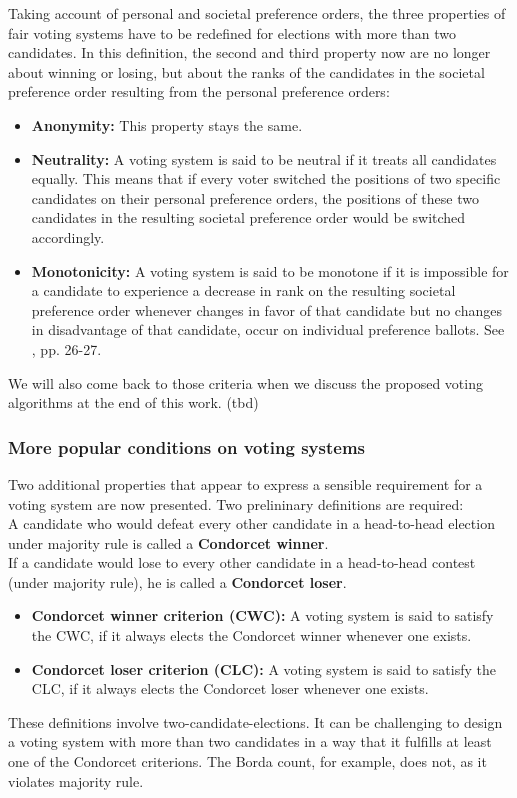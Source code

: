 Taking account of personal and societal preference orders, the three properties of fair voting systems have to be redefined for elections with more than two candidates. In this definition, the second and third property now are no longer about winning or losing, but about the ranks of the candidates in the societal preference order resulting from the personal preference orders:
\begin{itemize}
\item \textbf{Anonymity:} This property stays the same.  
\item \textbf{Neutrality:} A voting system is said to be neutral if it treats all candidates equally. This means that if every voter switched the positions of two specific candidates on their personal preference orders, the positions of these two candidates in the resulting societal preference order would be switched accordingly. 
\item\textbf{Monotonicity:} A voting system is said to be monotone if it is impossible for a candidate to experience a decrease in rank on the resulting societal preference order whenever changes in favor of that candidate but no changes in disadvantage of that candidate, occur on individual preference ballots. 
See \cite{voting}, pp. 26-27.
\end{itemize}
We will also come back to those criteria when we discuss the proposed voting algorithms at the end of this work. (tbd) \\

\subsubsection{More popular conditions on voting systems}
Two additional properties that appear to express a sensible requirement for a voting system are now presented. Two prelininary definitions are required: \\

A candidate who would defeat every other candidate in a head-to-head election under majority rule is called a {\textbf{Condorcet winner}}. \\
If a candidate would lose to every other candidate in a head-to-head contest (under majority rule), he is called a {\textbf{Condorcet loser}}. 
\begin{itemize}
\item {\textbf{Condorcet winner criterion (CWC):}} 
A voting system is said to satisfy the CWC, if it always elects the Condorcet winner whenever one exists.
\item {\textbf{Condorcet loser criterion (CLC):}} 
A voting system is said to satisfy the CLC, if it always elects the Condorcet loser whenever one exists. 
\end{itemize}
These definitions involve two-candidate-elections. It can be challenging to design a voting system with more than two candidates in a way that it fulfills at least one of the Condorcet criterions. The Borda count, for example, does not, as it violates majority rule. \\


